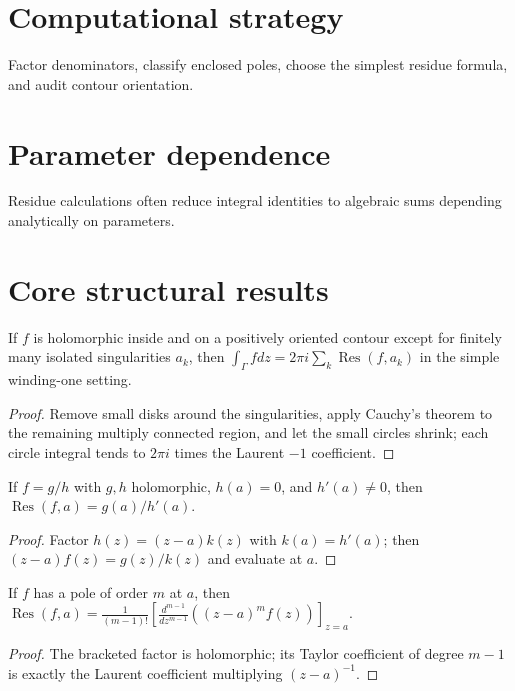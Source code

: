 \section{Computational strategy}
Factor denominators, classify enclosed poles, choose the simplest residue formula, and audit contour orientation.

\section{Parameter dependence}
Residue calculations often reduce integral identities to algebraic sums depending analytically on parameters.

\section{Core structural results}

\begin{theorem}\label{thm:iv10-01}
If $f$ is holomorphic inside and on a positively oriented contour except for finitely many isolated singularities $a_k$, then $\int_\Gamma fdz=2\pi i\sum_k\operatorname{Res}(f,a_k)$ in the simple winding-one setting.
\begin{proof}
Remove small disks around the singularities, apply Cauchy's theorem to the remaining multiply connected region, and let the small circles shrink; each circle integral tends to $2\pi i$ times the Laurent $-1$ coefficient.
\end{proof}
\end{theorem}

\begin{theorem}\label{thm:iv10-02}
If $f=g/h$ with $g,h$ holomorphic, $h(a)=0$, and $h'(a)\ne0$, then $\operatorname{Res}(f,a)=g(a)/h'(a)$.
\begin{proof}
Factor $h(z)=(z-a)k(z)$ with $k(a)=h'(a)$; then $(z-a)f(z)=g(z)/k(z)$ and evaluate at $a$.
\end{proof}
\end{theorem}

\begin{theorem}\label{thm:iv10-03}
If $f$ has a pole of order $m$ at $a$, then $\operatorname{Res}(f,a)=\frac1{(m-1)!}\left[\frac{d^{m-1}}{dz^{m-1}}((z-a)^mf(z))\right]_{z=a}$.
\begin{proof}
The bracketed factor is holomorphic; its Taylor coefficient of degree $m-1$ is exactly the Laurent coefficient multiplying $(z-a)^{-1}$.
\end{proof}
\end{theorem}

